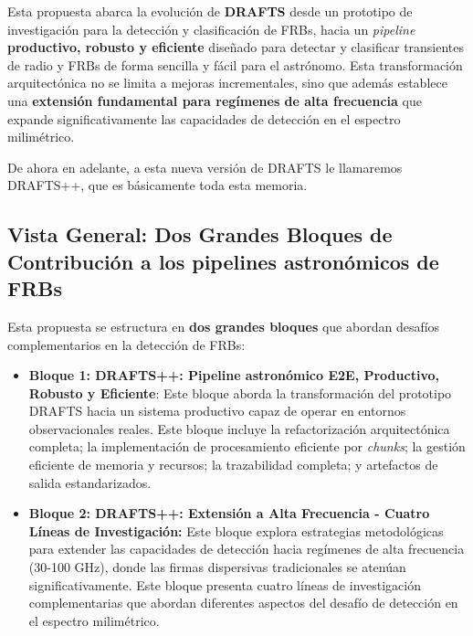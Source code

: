 \setcounter{secnumdepth}{4}
\setcounter{tocdepth}{4}
\makeatletter
\renewcommand\paragraph{\@startsection{paragraph}{4}{\z@}%
  {1.5ex \@plus .5ex \@minus .2ex}%
  {0.8ex \@plus .2ex}%
  {\normalfont\normalsize\bfseries}}  %
\makeatother



Esta propuesta abarca la evolución de \textbf{DRAFTS} \cite{zhang2024drafts} desde un prototipo de investigación para la detección y clasificación de FRBs, hacia un \textit{pipeline} 
\textbf{productivo, robusto y eficiente} diseñado para detectar y clasificar transientes de radio y FRBs de forma sencilla y fácil para el astrónomo. Esta transformación arquitectónica no se limita a 
mejoras incrementales, sino que además establece una \textbf{extensión fundamental para regímenes de alta frecuencia} que expande significativamente las capacidades de 
detección en el espectro milimétrico.

De ahora en adelante, a esta nueva versión de DRAFTS le llamaremos DRAFTS++, que es básicamente toda esta memoria.

\subsection{Vista General: Dos Grandes Bloques de Contribución a los pipelines astronómicos de FRBs}

Esta propuesta se estructura en \textbf{dos grandes bloques} que abordan desafíos complementarios en la detección de FRBs:

\begin{itemize}
    \item \textbf{Bloque 1: DRAFTS++: Pipeline astronómico E2E, Productivo, Robusto y Eficiente}: Este bloque aborda la transformación del prototipo DRAFTS hacia un sistema productivo capaz de operar en entornos observacionales reales. Este bloque incluye la refactorización arquitectónica completa; la implementación de procesamiento eficiente por \emph{chunks}; la gestión eficiente de memoria y recursos; la trazabilidad completa; y artefactos de salida estandarizados.

    \item \textbf{Bloque 2: DRAFTS++: Extensión a Alta Frecuencia - Cuatro Líneas de Investigación:} Este bloque explora estrategias metodológicas para extender las capacidades de detección hacia regímenes de alta frecuencia (30-100 GHz), donde las firmas dispersivas tradicionales se atenúan significativamente. Este bloque presenta cuatro líneas de investigación complementarias que abordan diferentes aspectos del desafío de detección en el espectro milimétrico.
\end{itemize}


